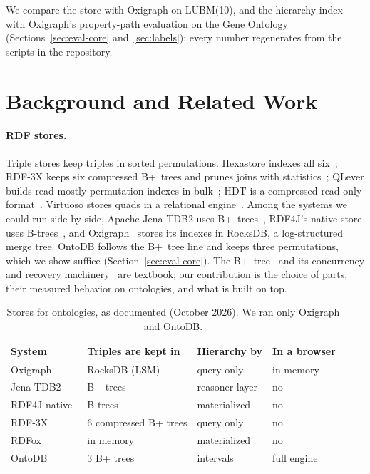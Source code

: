 \documentclass[sigconf, nonacm]{acmart}
\newcommand{\sys}{OntoDB}
\begin{document}
We compare the store with Oxigraph on LUBM(10), and the hierarchy index with Oxigraph's property-path evaluation on the Gene Ontology (Sections~\ref{sec:eval-core} and~\ref{sec:labels}); every number regenerates from the scripts in the repository.

\section{Background and Related Work}
\label{sec:related}

\paragraph{RDF stores.} Triple stores keep triples in sorted permutations. Hexastore indexes all six~\cite{weiss2008}; RDF-3X keeps six compressed B+~trees and prunes joins with statistics~\cite{neumann2010}; QLever builds read-mostly permutation indexes in bulk~\cite{bast2017}; HDT is a compressed read-only format~\cite{fernandez2013}. Virtuoso stores quads in a relational engine~\cite{erling2010}. Among the systems we could run side by side, Apache Jena TDB2 uses B+~trees~\cite{jenatdb}, RDF4J's native store uses B-trees~\cite{rdf4j}, and Oxigraph~\cite{oxigraph} stores its indexes in RocksDB, a log-structured merge tree. \sys{} follows the B+~tree line and keeps three permutations, which we show suffice (Section~\ref{sec:eval-core}). The B+~tree~\cite{bayer1972,comer1979} and its concurrency and recovery machinery~\cite{lehman1981,graefe2011,mohan1992} are textbook; our contribution is the choice of parts, their measured behavior on ontologies, and what is built on top.

\begin{table}[t]
\caption{Stores for ontologies, as documented (October 2026). We ran only Oxigraph and \sys.}
\label{tab:related}
\small
\begin{tabular}{@{}llll@{}}
\toprule
System & Triples are kept in & Hierarchy by & In a browser \\
\midrule
Oxigraph~\cite{oxigraph} & RocksDB (LSM) & query only & in-memory \\
Jena TDB2~\cite{jenatdb} & B+ trees & reasoner layer & no \\
RDF4J native~\cite{rdf4j} & B-trees & materialized & no \\
RDF-3X~\cite{neumann2010} & 6 compressed B+ trees & query only & no \\
RDFox~\cite{rdfox} & in memory & materialized & no \\
\sys{} & 3 B+ trees & intervals & full engine \\
\bottomrule
\end{tabular}
\end{table}
\end{document}
